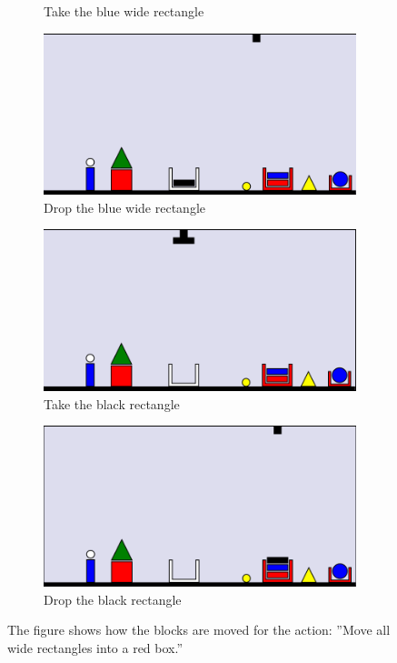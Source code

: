 \begin{figure}[p]
\begin{subfigure}{.5\textwidth}
  \caption{Take the blue wide rectangle}
  \label{fig:8}
\end{subfigure}
\begin{subfigure}{.5\textwidth}
  \centering
  \includegraphics[width=.7\linewidth]{fig/9.png}
  \caption{Drop the blue wide rectangle}
  \label{fig:9}
\end{subfigure}%
\begin{subfigure}{.5\textwidth}
  \centering
  \includegraphics[width=.7\linewidth]{fig/10.png}
  \caption{Take the black rectangle}
  \label{fig:10}
\end{subfigure}
\begin{subfigure}{.5\textwidth}
  \centering
  \includegraphics[width=.7\linewidth]{fig/11.png}
  \caption{Drop the black rectangle}
  \label{fig:11}
\end{subfigure}
\caption{The figure shows how the blocks are moved for the action: ''Move all wide rectangles into a red 
box.''}
\label{fig:moveex}
\end{figure}
